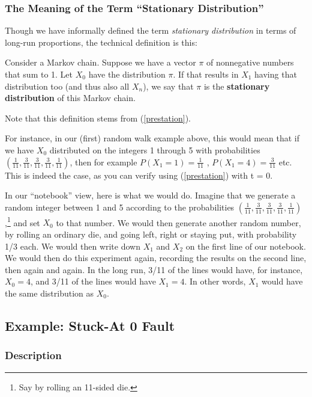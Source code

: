 \subsubsection{The Meaning of the Term ``Stationary Distribution''}
\label{stationmeaning}

Though we have informally defined the term {\it stationary distribution}
in terms of long-run proportions, the technical definition is this:

\begin{definition}  Consider a Markov chain.  Suppose we have a 
vector $\pi$ of nonnegative numbers that sum to 1.
Let $X_0$ have the distribution $\pi$.  If that results in $X_1$ having
that distribution too (and thus also all $X_n$), we say that $\pi$ 
is the {\bf stationary distribution} of this Markov chain.
\end{definition}

Note that this definition stems from (\ref{prestation}).

For instance, in our (first) random walk example above, this would mean
that if we have $X_0$ distributed on the integers 1 through 5 with
probabilities
$(\frac{1}{11},\frac{3}{11},\frac{3}{11},\frac{3}{11},\frac{1}{11})$,
then for example $P(X_1 = 1) = \frac{1}{11}$ , $P(X_1 = 4) =
\frac{3}{11}$ etc.  This is indeed the case, as you can verify using
(\ref{prestation}) with t = 0.

In our ``notebook'' view, here is what we would do.  Imagine that we
generate a random integer between 1 and 5 according to the probabilities
$(\frac{1}{11},\frac{3}{11},\frac{3}{11},\frac{3}{11},
\frac{1}{11})$,\footnote{Say by rolling an 11-sided die.} and set $X_0$
to that number.  We would then generate another random number, by
rolling an ordinary die, and going left, right or staying put, with
probability 1/3 each.  We would then write down $X_1$ and $X_2$ on the
first line of our notebook.  We would then do this experiment again,
recording the results on the second line, then again and again.  In the
long run, 3/11 of the lines would have, for instance, $X_0 = 4$, and
3/11 of the lines would have $X_1 = 4$.  In other words, $X_1$ would
have the same distribution as $X_0$.

\subsection{Example:  Stuck-At 0 Fault} 
\label{stuckat}

\subsubsection{Description}

